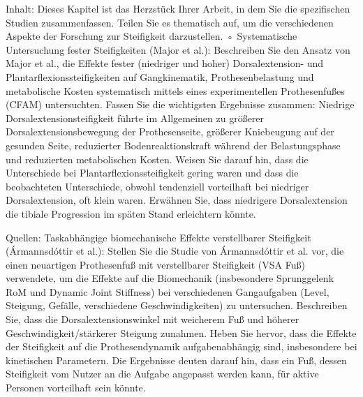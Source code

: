 \documentclass{SeminarV2}
\begin{document}
Inhalt: Dieses Kapitel ist das Herzstück Ihrer Arbeit, in dem Sie die spezifischen Studien zusammenfassen. Teilen Sie es thematisch auf, um die verschiedenen Aspekte der Forschung zur Steifigkeit darzustellen.
◦
Systematische Untersuchung fester Steifigkeiten (Major et al.): Beschreiben Sie den Ansatz von Major et al., die Effekte fester (niedriger und hoher) Dorsalextension- und Plantarflexionssteifigkeiten auf Gangkinematik, Prothesenbelastung und metabolische Kosten systematisch mittels eines experimentellen Prothesenfußes (CFAM) untersuchten. Fassen Sie die wichtigsten Ergebnisse zusammen: Niedrige Dorsalextensionsteifigkeit führte im Allgemeinen zu größerer Dorsalextensionsbewegung der Prothesenseite, größerer Kniebeugung auf der gesunden Seite, reduzierter Bodenreaktionskraft während der Belastungsphase und reduzierten metabolischen Kosten. Weisen Sie darauf hin, dass die Unterschiede bei Plantarflexionssteifigkeit gering waren und dass die beobachteten Unterschiede, obwohl tendenziell vorteilhaft bei niedriger Dorsalextension, oft klein waren. Erwähnen Sie, dass niedrigere Dorsalextension die tibiale Progression im späten Stand erleichtern könnte.

Quellen:
Taskabhängige biomechanische Effekte verstellbarer Steifigkeit (Ármannsdóttir et al.): Stellen Sie die Studie von Ármannsdóttir et al. vor, die einen neuartigen Prothesenfuß mit verstellbarer Steifigkeit (VSA Fuß) verwendete, um die Effekte auf die Biomechanik (insbesondere Sprunggelenk RoM und Dynamic Joint Stiffness) bei verschiedenen Gangaufgaben (Level, Steigung, Gefälle, verschiedene Geschwindigkeiten) zu untersuchen. Beschreiben Sie, dass die Dorsalextensionswinkel mit weicherem Fuß und höherer Geschwindigkeit/stärkerer Steigung zunahmen. Heben Sie hervor, dass die Effekte der Steifigkeit auf die Prothesendynamik aufgabenabhängig sind, insbesondere bei kinetischen Parametern. Die Ergebnisse deuten darauf hin, dass ein Fuß, dessen Steifigkeit vom Nutzer an die Aufgabe angepasst werden kann, für aktive Personen vorteilhaft sein könnte.
\end{document}

